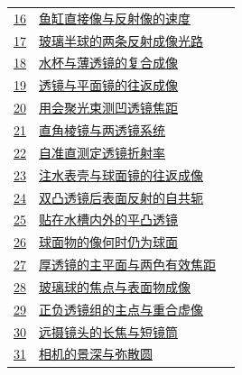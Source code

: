 \documentclass[UTF8,fontset=fandol,a4paper,11pt]{ctexart}
\begin{document}
\begin{longtable}{@{}r p{113mm} r@{}}
\hyperref[q:16]{16} & \hyperref[q:16]{鱼缸直接像与反射像的速度} & \pageref{q:16} \\

\hyperref[q:17]{17} & \hyperref[q:17]{玻璃半球的两条反射成像光路} & \pageref{q:17} \\

\hyperref[q:18]{18} & \hyperref[q:18]{水杯与薄透镜的复合成像} & \pageref{q:18} \\

\hyperref[q:19]{19} & \hyperref[q:19]{透镜与平面镜的往返成像} & \pageref{q:19} \\

\hyperref[q:20]{20} & \hyperref[q:20]{用会聚光束测凹透镜焦距} & \pageref{q:20} \\

\hyperref[q:21]{21} & \hyperref[q:21]{直角棱镜与两透镜系统} & \pageref{q:21} \\

\hyperref[q:22]{22} & \hyperref[q:22]{自准直测定透镜折射率} & \pageref{q:22} \\

\hyperref[q:23]{23} & \hyperref[q:23]{注水表壳与球面镜的往返成像} & \pageref{q:23} \\

\hyperref[q:24]{24} & \hyperref[q:24]{双凸透镜后表面反射的自共轭} & \pageref{q:24} \\

\hyperref[q:25]{25} & \hyperref[q:25]{贴在水槽内外的平凸透镜} & \pageref{q:25} \\

\hyperref[q:26]{26} & \hyperref[q:26]{球面物的像何时仍为球面} & \pageref{q:26} \\

\hyperref[q:27]{27} & \hyperref[q:27]{厚透镜的主平面与两色有效焦距} & \pageref{q:27} \\

\hyperref[q:28]{28} & \hyperref[q:28]{玻璃球的焦点与表面物成像} & \pageref{q:28} \\

\hyperref[q:29]{29} & \hyperref[q:29]{正负透镜组的主点与重合虚像} & \pageref{q:29} \\

\hyperref[q:30]{30} & \hyperref[q:30]{远摄镜头的长焦与短镜筒} & \pageref{q:30} \\

\hyperref[q:31]{31} & \hyperref[q:31]{相机的景深与弥散圆} & \pageref{q:31} \\


\end{longtable}
\end{document}
